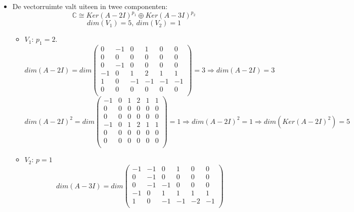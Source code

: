 \documentclass[main.tex]{subfiles}
\begin{document}
\begin{itemize}
\begin{itemize}
\[\begin{array}{l}
      \right)\\
      =
      (X-2)^{3}
      \left(
        (X-2)\left(X^{2}-5X+5\right)
        + ((X-2)
      \right)\\
      =
      (X-2)^{4}
      \left(X^{2}-5X+6\right)\\
      =
      (X-2)^{5}(X-3)\\
    \end{array}
    \]
  \item De vectorruimte valt uiteen in twee componenten:
    \[ \mathbb{C} \cong Ker(A-2I)^{p_{1}} \oplus Ker(A-3I)^{p_{2}} \]
    \[ dim(V_{1}) = 5,\ dim(V_{2})=1 \]
    \begin{itemize}
    \item $V_{1}$: $p_{1}=2$.
      \[
      dim(A-2I) = dim 
      \begin{pmatrix}
        0 & -1 & 0 & 1 & 0 & 0\\
        0 & 0 & 0 & 0 & 0 & 0\\
        0 & -1 & 0 & 0 & 0 & 0\\
        -1 & 0 & 1 & 2 & 1 & 1\\
        1 & 0 & -1 & -1 & -1 & -1\\
        0 & 0 & 0 & 0 & 0 & 0\\
      \end{pmatrix}
      =3 \Rightarrow dim(A-2I) = 3
      \]
      \[ dim(A-2I)^{2} = dim
      \begin{pmatrix}
        -1 & 0 & 1 & 2 & 1 & 1\\
        0 & 0 & 0 & 0 & 0 & 0\\
        0 & 0 & 0 & 0 & 0 & 0\\
        -1 & 0 & 1 & 2 & 1 & 1\\
        0 & 0 & 0 & 0 & 0 & 0\\
        0 & 0 & 0 & 0 & 0 & 0\\
      \end{pmatrix}
      =1 \Rightarrow dim(A-2I)^{2} = 1 \Rightarrow dim(Ker(A-2I)^{2}) = 5
      \]
    \item $V_{2}$: $p=1$
      \[
      dim(A-3I) = dim
      \begin{pmatrix}
        -1 & -1 & 0 & 1 & 0 & 0\\
        0 & -1 & 0 & 0 & 0 & 0\\
        0 & -1 & -1 & 0 & 0 & 0\\
        -1 & 0 & 1 & 1 & 1 & 1\\
        1 & 0 & -1 & -1 & -2 & -1\\

\end{pmatrix}\]
\end{itemize}
\end{itemize}
\end{itemize}
\end{document}
